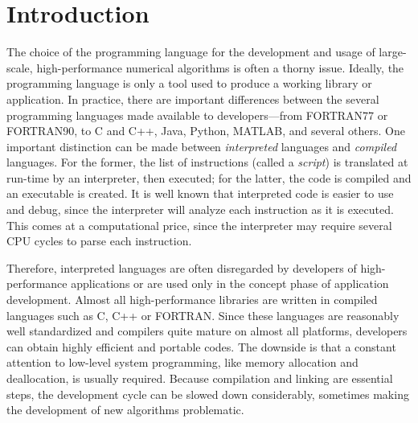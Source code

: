 \documentclass[10pt,relax]{SANDreport}
\begin{document}
\section{Introduction}
\label{sec:intro}

The choice of the programming language for the development and usage
of large-scale, high-performance numerical algorithms is often a
thorny issue. Ideally, the programming language is only a tool used
to produce a working library or application. In practice, there are
important differences between the several programming languages made
available to developers---from FORTRAN77 or FORTRAN90, to C and C++,
Java, Python, MATLAB, and several others. One important distinction
can be made between {\sl interpreted} languages and {\sl compiled}
languages. For the former, the list of instructions (called a {\sl
script}) is translated at run-time by an interpreter, then executed;
for the latter, the code is compiled and an executable is created.
It is well known that interpreted code is easier to use and debug,
since the interpreter will analyze each instruction as it is
executed. This comes at a computational price, since the interpreter
may require several CPU cycles to parse each instruction.

Therefore, interpreted languages are often disregarded by developers
of high-performance applications or are used only in the concept
phase of application development. Almost all high-performance
libraries are written in compiled languages such as C, C++ or
FORTRAN. Since these languages are reasonably well standardized and
compilers quite mature on almost all platforms, developers can
obtain highly efficient and portable codes.  The downside is that a
constant attention to low-level system programming, like memory
allocation and deallocation, is usually required. Because
compilation and linking are essential steps, the development cycle
can be slowed down considerably, sometimes making the development of
new algorithms problematic.
\end{document}
